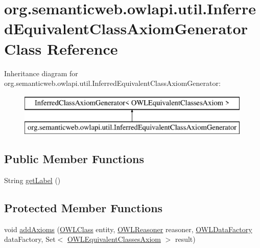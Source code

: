 \hypertarget{classorg_1_1semanticweb_1_1owlapi_1_1util_1_1_inferred_equivalent_class_axiom_generator}{\section{org.\-semanticweb.\-owlapi.\-util.\-Inferred\-Equivalent\-Class\-Axiom\-Generator Class Reference}
\label{classorg_1_1semanticweb_1_1owlapi_1_1util_1_1_inferred_equivalent_class_axiom_generator}
}
Inheritance diagram for org.\-semanticweb.\-owlapi.\-util.\-Inferred\-Equivalent\-Class\-Axiom\-Generator\-:\begin{figure}[H]
\begin{center}
\leavevmode
\includegraphics[height=2.000000cm]{classorg_1_1semanticweb_1_1owlapi_1_1util_1_1_inferred_equivalent_class_axiom_generator}
\end{center}
\end{figure}
\subsection*{Public Member Functions}
\begin{DoxyCompactItemize}
\item 
String \hyperlink{classorg_1_1semanticweb_1_1owlapi_1_1util_1_1_inferred_equivalent_class_axiom_generator_a54a4eebeb8bc85adb31627bd146812c2}{get\-Label} ()
\end{DoxyCompactItemize}
\subsection*{Protected Member Functions}
\begin{DoxyCompactItemize}
\item 
void \hyperlink{classorg_1_1semanticweb_1_1owlapi_1_1util_1_1_inferred_equivalent_class_axiom_generator_a691f9093d1b09e022bbefebfa6918c5c}{add\-Axioms} (\hyperlink{interfaceorg_1_1semanticweb_1_1owlapi_1_1model_1_1_o_w_l_class}{O\-W\-L\-Class} entity, \hyperlink{interfaceorg_1_1semanticweb_1_1owlapi_1_1reasoner_1_1_o_w_l_reasoner}{O\-W\-L\-Reasoner} reasoner, \hyperlink{interfaceorg_1_1semanticweb_1_1owlapi_1_1model_1_1_o_w_l_data_factory}{O\-W\-L\-Data\-Factory} data\-Factory, Set$<$ \hyperlink{interfaceorg_1_1semanticweb_1_1owlapi_1_1model_1_1_o_w_l_equivalent_classes_axiom}{O\-W\-L\-Equivalent\-Classes\-Axiom} $>$ result)
\end{DoxyCompactItemize}


